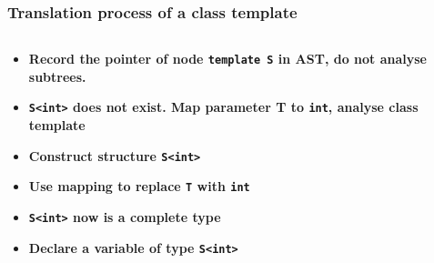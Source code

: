 \documentclass{beamer}
\begin{document}
\begin{frame}
    \frametitle{Translation process of a class template}

    \begin{columns}

        \begin{column}[]{0.5\textwidth}
            \begin{itemize}
                \small
                \pause
                \item \textbf<2>{Record the pointer of node \lstinline{template S} in AST, do not analyse subtrees. }\pause
                      \pause
                      \pause
                \item \textbf<5>{\lstinline{S<int>} does not exist. Map parameter T to \lstinline{int}, analyse class template}\pause
                \item \textbf<6>{Construct structure \lstinline{S<int>}}\pause
                      \pause
                \item \textbf<8>{Use mapping to replace \lstinline{T} with \lstinline{int}}\pause
                      \pause
                \item \textbf<10>{\lstinline{S<int>} now is a complete type }\pause
                \item \textbf<11>{Declare a variable of type \lstinline{S<int>}}
            \end{itemize}
        \end{column}
    \end{columns}

\end{frame}
\end{document}
